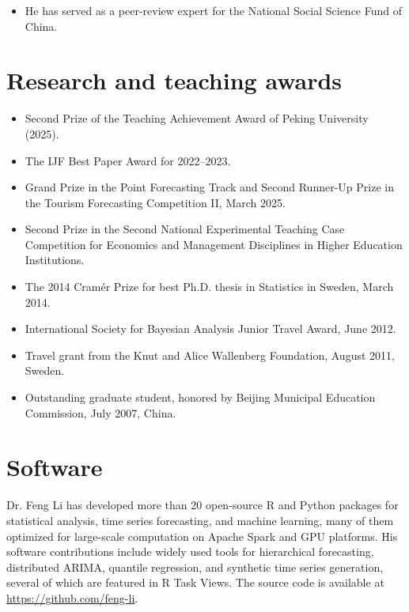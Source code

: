 \documentclass[twoside,a4paper]{article}
\begin{document}
\begin{refsection}
\begin{itemize}
\item He has served as a peer-review expert for the National Social Science Fund of China.
\end{itemize}


\section{Research and teaching awards}
\begin{itemize}

\item Second Prize of the Teaching Achievement Award of Peking University (2025).

\item The IJF Best Paper Award for 2022–2023.

\item Grand Prize in the Point Forecasting Track and Second Runner-Up Prize in the Tourism Forecasting Competition II, March 2025.

\item Second Prize in the Second National Experimental Teaching Case Competition for Economics and Management Disciplines in Higher Education Institutions.

\item The 2014 Cramér Prize for best Ph.D. thesis in Statistics in Sweden, March 2014.

\item International Society for Bayesian Analysis Junior Travel Award, June 2012.

\item Travel grant from the Knut and Alice Wallenberg Foundation, August 2011, Sweden.

\item Outstanding graduate student, honored by Beijing Municipal Education Commission, July 2007, China.

\end{itemize}

\newpage
\section{Software}

Dr. Feng Li has developed more than 20 open-source R and Python packages for statistical analysis, time series forecasting, and machine learning, many of them optimized for large-scale computation on Apache Spark and GPU platforms. His software contributions include widely used tools for hierarchical forecasting, distributed ARIMA, quantile regression, and synthetic time series generation, several of which are featured in R Task Views. The source code is available at \url{https://github.com/feng-li}.


\end{refsection}
\end{document}
